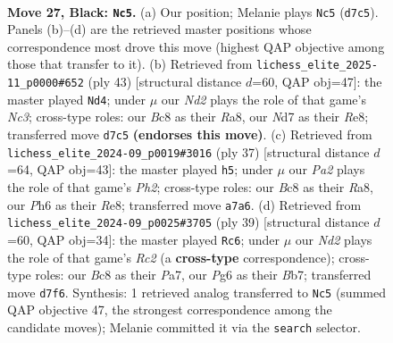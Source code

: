 \documentclass[11pt]{article}
\begin{document}
\clearpage

\begin{figure}[p]\centering
\begin{subfigure}{0.46\textwidth}\centering
\resizebox{\linewidth}{!}{%
\newchessgame
\chessboard[
  setfen={1rb2r2/p2n1p1k/1pB1p1pp/8/1RP5/N1B1P2P/P4PP1/4RK2 b - - 0 27},
  showmover=false,
  pgfstyle=straightmove, color=movearrow, markmove={d7-c5}
]}
\caption{}
\end{subfigure}\hfill
\begin{subfigure}{0.46\textwidth}\centering
\resizebox{\linewidth}{!}{%
\newchessgame
\chessboard[
  setfen={r3r1k1/pp1Bpp1p/2n3p1/2pP2B1/1b6/1P5P/P4PP1/2R2RK1 b - - 0 22},
  showmover=false,
  pgfstyle=straightmove, color=movearrow, markmove={c6-d4}
]}
\caption{}
\end{subfigure}
\\[4pt]
\begin{subfigure}{0.46\textwidth}\centering
\resizebox{\linewidth}{!}{%
\newchessgame
\chessboard[
  setfen={r3r1k1/1p2bppp/p4n2/8/3Bp3/1N4P1/PPP1RP1P/2K1R3 b - - 4 19},
  showmover=false,
  pgfstyle=straightmove, color=movearrow, markmove={h7-h5}
]}
\caption{}
\end{subfigure}\hfill
\begin{subfigure}{0.46\textwidth}\centering
\resizebox{\linewidth}{!}{%
\newchessgame
\chessboard[
  setfen={5rk1/pbr1npp1/8/2ppB1p1/8/1P4PB/P3PP1P/2R2RK1 b - - 4 20},
  showmover=false,
  pgfstyle=straightmove, color=movearrow, markmove={c7-c6}
]}
\caption{}
\end{subfigure}
\caption{\textbf{Move 27, Black: \texttt{Nc5}.} (a) Our position; Melanie plays \texttt{Nc5} (\texttt{d7c5}). Panels (b)--(d) are the retrieved master positions whose correspondence most drove this move (highest QAP objective among those that transfer to it). (b) Retrieved from \texttt{lichess\_elite\_2025-11\_p0000\#652} (ply 43) [structural distance $d$=60, QAP obj=47]: the master played \texttt{Nd4}; under $\mu$ our \emph{Nd2} plays the role of that game's \emph{Nc3}; cross-type roles: our \emph{B}c8 as their \emph{R}a8, our \emph{N}d7 as their \emph{R}e8; transferred move \texttt{d7c5} \textbf{(endorses this move)}. (c) Retrieved from \texttt{lichess\_elite\_2024-09\_p0019\#3016} (ply 37) [structural distance $d$=64, QAP obj=43]: the master played \texttt{h5}; under $\mu$ our \emph{Pa2} plays the role of that game's \emph{Ph2}; cross-type roles: our \emph{B}c8 as their \emph{R}a8, our \emph{P}h6 as their \emph{R}e8; transferred move \texttt{a7a6}. (d) Retrieved from \texttt{lichess\_elite\_2024-09\_p0025\#3705} (ply 39) [structural distance $d$=60, QAP obj=34]: the master played \texttt{Rc6}; under $\mu$ our \emph{Nd2} plays the role of that game's \emph{Rc2} (a \textbf{cross-type} correspondence); cross-type roles: our \emph{B}c8 as their \emph{P}a7, our \emph{P}g6 as their \emph{B}b7; transferred move \texttt{d7f6}. Synthesis: 1 retrieved analog transferred to \texttt{Nc5} (summed QAP objective 47, the strongest correspondence among the candidate moves); Melanie committed it via the \texttt{search} selector.}
\label{fig:thought-m53}
\end{figure}
\end{document}
